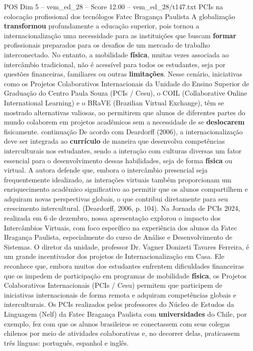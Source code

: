 \begin{textsample}{POS Dim 5 – vem\_ed\_28 – Score 12.00 – vem\_ed\_28/t147.txt}  \label{ex:f5_pos_168}
PCIs na colocação profissional dos tecnólogos Fatec Bragança Paulista A globalização \textbf{transformou} profundamente a educação superior, pois tornou a internacionalização uma necessidade para as instituições que buscam \textbf{formar} profissionais preparados para os desafios de um mercado de trabalho interconectado.
No entanto, a mobilidade \textbf{física}, muitas vezes associada ao intercâmbio tradicional, não é acessível para todos os estudantes, seja por questões financeiras, familiares ou outras \textbf{limitações}.
Nesse cenário, iniciativas como os Projetos Colaborativos Internacionais da Unidade do Ensino Superior de Graduação do Centro Paula Souza (PCIs / Cesu), o COIL (Collaborative Online International Learning) e o BRaVE (Brazilian Virtual Exchange), têm se mostrado alternativas valiosas, ao permitirem que alunos de diferentes partes do mundo colaborem em projetos acadêmicos sem a necessidade de se \textbf{deslocarem} fisicamente. continuação De acordo com Deardorff (2006), a internacionalização deve ser integrada ao \textbf{currículo} de maneira que desenvolva competências interculturais nos estudantes, sendo a interação com culturas diversas um fator essencial para o desenvolvimento dessas habilidades, seja de forma \textbf{física} ou virtual.
A autora defende que, embora o intercâmbio presencial seja frequentemente idealizado, as interações virtuais também proporcionam um enriquecimento acadêmico significativo ao permitir que os alunos compartilhem e adquiram novas perspectivas globais, o que contribui diretamente para seu crescimento intercultural. (Deardorff, 2006, p. 104).
Na Jornada de PCIs 2024, realizada em 6 de dezembro, nossa apresentação explorou o impacto dos Intercâmbios Virtuais, com foco específico na experiência dos alunos da Fatec Bragança Paulista, especialmente do curso de Análise e Desenvolvimento de Sistemas.
O diretor da unidade, professor Dr.
Vagner Donizeti Tavares Ferreira, é um grande incentivador dos projetos de Internacionalização em Casa.
Ele reconhece que, embora muitos dos estudantes enfrentem dificuldades financeiras que os impedem de participação em programas de mobilidade \textbf{física}, os Projetos Colaborativos Internacionais (PCIs / Cesu) permitem que participem de iniciativas internacionais de forma remota e adquiram competências globais e interculturais.
Os PCIs realizados pelos professores do Núcleo de Estudos da Linguagem (Nelf) da Fatec Bragança Paulista com \textbf{universidades} do Chile, por exemplo, fez com que os alunos brasileiros se conectassem com seus colegas chilenos por meio de atividades colaborativas e, no decorrer delas, praticassem três línguas: português, espanhol e inglês.

\end{textsample}
